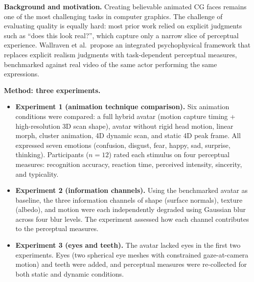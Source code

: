 \documentclass[11pt, a4paper]{article}
\begin{document}
\textbf{Background and motivation.} Creating believable animated CG faces remains one of the most challenging tasks in computer graphics. The challenge of evaluating quality is equally hard: most prior work relied on explicit judgments such as ``does this look real?'', which capture only a narrow slice of perceptual experience. Wallraven et al.\ propose an integrated psychophysical framework that replaces explicit realism judgments with task-dependent perceptual measures, benchmarked against real video of the same actor performing the same expressions.

\textbf{Method: three experiments.}
\begin{itemize}[leftmargin=2em]
  \item \textbf{Experiment 1 (animation technique comparison).} Six animation conditions were compared: a full hybrid avatar (motion capture timing + high-resolution 3D scan shape), avatar without rigid head motion, linear morph, cluster animation, 4D dynamic scan, and static 4D peak frame. All expressed seven emotions (confusion, disgust, fear, happy, sad, surprise, thinking). Participants ($n = 12$) rated each stimulus on four perceptual measures: recognition accuracy, reaction time, perceived intensity, sincerity, and typicality.
  \item \textbf{Experiment 2 (information channels).} Using the benchmarked avatar as baseline, the three information channels of shape (surface normals), texture (albedo), and motion were each independently degraded using Gaussian blur across four blur levels. The experiment assessed how each channel contributes to the perceptual measures.
  \item \textbf{Experiment 3 (eyes and teeth).} The avatar lacked eyes in the first two experiments. Eyes (two spherical eye meshes with constrained gaze-at-camera motion) and teeth were added, and perceptual measures were re-collected for both static and dynamic conditions.
\end{itemize}
\end{document}
